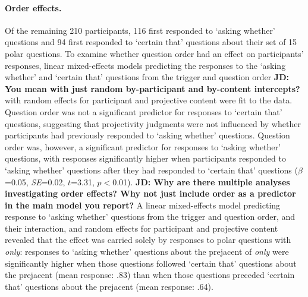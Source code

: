 \documentclass[11pt,fleqn]{article}
\newcommand{\6}{\mbox{$[\hspace*{-.6mm}[$}}
\newcommand{\9}{\mbox{$]\hspace*{-.6mm}]$}}
\begin{document}
\paragraph{Order effects.} Of the remaining 210 participants, 116 first responded to `asking whether' questions and 94 first responded to `certain that' questions about their set of 15 polar questions. To examine whether question order had an effect on participants' responses, linear mixed-effects models predicting the responses to the `asking whether' and `certain that' questions from the trigger and question order {\bf JD: You mean with just random by-participant and by-content intercepts?} with random effects for participant and projective content were fit to the data. Question order was not a significant predictor for responses to `certain that' questions, suggesting that projectivity judgments were not influenced by whether participants had previously responded to `asking whether' questions. Question order was, however, a significant predictor for responses to `asking whether' questions, with responses significantly higher when participants responded to `asking whether' questions after they had responded to `certain that' questions ($\beta$=0.05,  {\em SE}=0.02, $t$=3.31, $p<$0.01). {\bf JD: Why are there multiple analyses investigating order effects? Why not just include order as a predictor in the main model you report?} A linear mixed-effects model predicting response to `asking whether' questions from the trigger and question order, and their interaction, and random effects for participant and projective content revealed that the effect was carried solely by responses to polar questions with {\em only}: responses to `asking whether' questions about the prejacent of {\em only} were significantly higher when those questions followed `certain that' questions about the prejacent (mean response: .83) than when those questions preceded `certain that' questions about the prejacent (mean response: .64).
\end{document}
